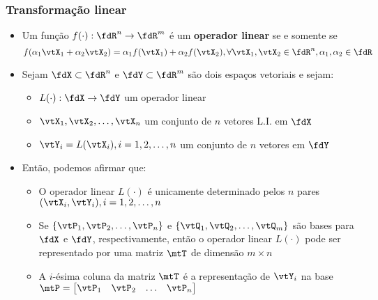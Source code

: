 \begin{frame}
  \frametitle{Transformação linear}
  \begin{itemize}
    \item Um função $f(\cdot) : \fdR^n \rightarrow \fdR^m$ é um \textbf{\alert{operador linear}} se e somente se
    \begin{equation}\label{eq_lin_operator}
      f(\alpha_1\vtX_1+\alpha_2\vtX_2) = \alpha_1 f(\vtX_1)+\alpha_2 f(\vtX_2), \forall \vtX_1, \vtX_2 \in \fdR^n, \alpha_1, \alpha_2 \in \fdR
    \end{equation}
    \item Sejam $\fdX \subset \fdR^n$ e $\fdY \subset \fdR^m$ são dois espaços vetoriais e sejam:
    \begin{itemize}
      \item $L(\cdot) : \fdX \rightarrow \fdY$ um operador linear
      \item $\vtX_1, \vtX_2, \ldots, \vtX_n$ um conjunto de $n$ vetores L.I. em $\fdX$
      \item $\vtY_i = L(\vtX_i), i = 1, 2, \ldots, n$ um conjunto de $n$ vetores em $\fdY$
    \end{itemize}
    \item Então, podemos afirmar que:
    \begin{itemize}
      \item O operador linear $L(\cdot)$ é unicamente determinado pelos $n$ pares $(\vtX_i, \vtY_i), i = 1, 2, \ldots, n$
      \item Se $\{\vtP_1, \vtP_2, \ldots, \vtP_n\}$ e $\{\vtQ_1, \vtQ_2, \ldots, \vtQ_m\}$ são bases para $\fdX$ e $\fdY$, respectivamente, então o operador linear $L(\cdot)$ pode ser representado por uma matriz $\mtT$ de dimensão $m\times n$
      \item A $i$-ésima coluna da matriz $\mtT$ é a representação de $\vtY_i$ na base $\mtP = \left[\begin{matrix}\vtP_1 & \vtP_2 & \ldots & \vtP_n\end{matrix}\right]$
    \end{itemize}
  \end{itemize}
\end{frame}

